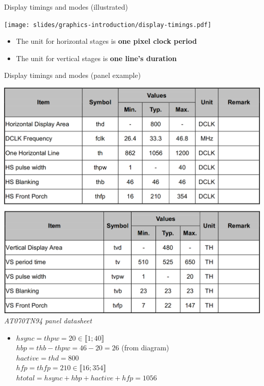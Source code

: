 \begin{frame}{Display timings and modes (illustrated)}
  \begin{center}
  \texttt{[image: slides/graphics-introduction/display-timings.pdf]}
  \end{center}

  \begin{itemize}
  \item The unit for horizontal stages is \textbf{one pixel clock period}
  \item The unit for vertical stages is \textbf{one line's duration}
  \end{itemize}
\end{frame}

\begin{frame}{Display timings and modes (panel example)}

  \begin{minipage}[b]{0.35\textwidth}
    \centering
    \vspace{2em}
    \includegraphics[width=\textwidth]{slides/graphics-introduction/timings-table.png}
    \textit{\small AT070TN94 panel datasheet}
    \vfill~
  \end{minipage}
  \hfill
  \begin{minipage}[b]{0.6\textwidth}
    \small
    \begin{itemize}
    \item \(hsync = thpw = 20 \in \llbracket 1;40 \rrbracket\)\\
    \(hbp = thb - thpw = 46 - 20 = 26\) (from diagram)\\
    \(hactive = thd = 800\)\\
    \(hfp = thfp = 210 \in \llbracket 16;354 \rrbracket\)\\
    \(htotal = hsync + hbp + hactive + hfp = 1056\)


\end{itemize}
\end{minipage}
\end{frame}
